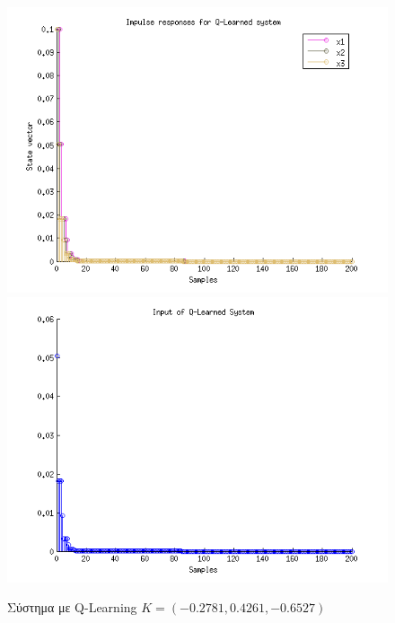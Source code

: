 \documentclass[a4paper,oneside,12pt]{article}
\begin{document}
\begin{figure}[H]
\centering
\includegraphics[scale=1.0]{q_state.png} \\
\includegraphics[scale=1.0]{q_input.png}
\caption{Σύστημα με Q-Learning $K = (-0.2781,    0.4261,   -0.6527)$ }
\label{}
\end{figure}
\end{document}
